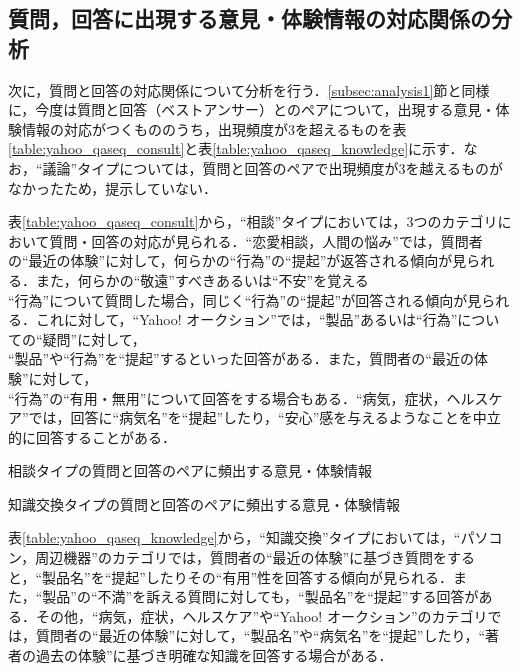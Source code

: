\documentclass[japanese]{jnlp_1.4}
\begin{document}
\subsection{質問，回答に出現する意見・体験情報の対応関係の分析}
\label{subsec:analysis2}

次に，質問と回答の対応関係について分析を行う．\ref{subsec:analysis1}節と同様に，今度は質問と回答（ベストアンサー）とのペアについて，出現する意見・体験情報の対応がつくもののうち，出現頻度が3を超えるものを表\ref{table:yahoo_qaseq_consult}と表\ref{table:yahoo_qaseq_knowledge}に示す．なお，``議論''タイプについては，質問と回答のペアで出現頻度が3を越えるものがなかったため，提示していない．

表\ref{table:yahoo_qaseq_consult}から，``相談''タイプにおいては，3つのカテゴリにおいて質問・回答の対応が見られる．``恋愛相談，人間の悩み''では，質問者の``最近の体験''に対して，何らかの``行為''の``提起''が返答される傾向が見られる．また，何らかの``敬遠''すべきあるいは``不安''を覚える\\
``行為''について質問した場合，同じく``行為''の``提起''が回答される傾向が見られる．これに対して，``Yahoo! オークション''では，``製品''あるいは``行為''についての``疑問''に対して，\\
``製品''や``行為''を``提起''するといった回答がある．また，質問者の``最近の体験''に対して，\\
``行為''の``有用・無用''について回答をする場合もある．``病気，症状，ヘルスケア''では，回答に``病気名''を``提起''したり，``安心''感を与えるようなことを中立的に回答することがある．

\begin{table}[t]
\caption{相談タイプの質問と回答のペアに頻出する意見・体験情報}
\label{table:yahoo_qaseq_consult}

\end{table}
\begin{table}[t]
\caption{知識交換タイプの質問と回答のペアに頻出する意見・体験情報}
\label{table:yahoo_qaseq_knowledge}

\end{table}

表\ref{table:yahoo_qaseq_knowledge}から，``知識交換''タイプにおいては，``パソコン，周辺機器''のカテゴリでは，質問者の``最近の体験''に基づき質問をすると，``製品名''を``提起''したりその``有用''性を回答する傾向が見られる．また，``製品''の``不満''を訴える質問に対しても，``製品名''を``提起''する回答がある．その他，``病気，症状，ヘルスケア''や``Yahoo! オークション''のカテゴリでは，質問者の``最近の体験''に対して，``製品名''や``病気名''を``提起''したり，``著者の過去の体験''に基づき明確な知識を回答する場合がある．
\end{document}
